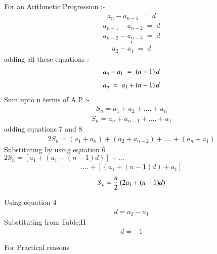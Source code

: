 \documentclass[journal,12pt,twocolumn]{IEEEtran}
\theoremstyle{remark}
\begin{document}
For an Arithmetic Progression :-
\begin{align}a_n-a_{n-1} \; = \; d \end{align}
\begin{align}a_{n-1}-a_{n-2} \; = \; d \end{align}
\begin{align}a_{n-2}-a_{n-3} \; = \; d \end{align}
$$.$$
$$.$$
$$.$$
\begin{align}a_2-a_{1} \; = \; d \end{align}
adding all these equations :-
\begin{align}a_{n}-a_{1} \; = \; \left(n-1\right) d \end{align}
\begin{align}a_{n} \; = \; a_1+\left(n-1\right) d \end{align}
Sum upto n terms of A.P :-
\begin{align}S_n=a_1+a_2+....+a_n\end{align}
\begin{align}S_n=a_n+a_{n-1}+....+a_1\end{align}
adding equations 7 and 8 
\begin{align}2 S_n=(a_1+a_n)+(a_2+a_{n-2})+....+(a_n+a_1)\end{align}
Substituting by using equation 6 \\
$2 S_n=[a_1+(a_1 +(n-1) d)]+ ...$
\begin{align}....+[(a_1 + (n-1) d) + a_1]\end{align}
\begin{align}S_n=\frac{n}{2}\left(2a_1 + (n-1) d\right)\end{align}
\begin{table}[h!]
   
        
       
    \end{table}
Using equation 4 
\begin{align}d=a_2-a_1\end{align}
Substituting from Table:II
\begin{align}d=-1\end{align}
\begin{table}[h!]
   
        
       
    \end{table}
For Practical reasons 
\end{document}
